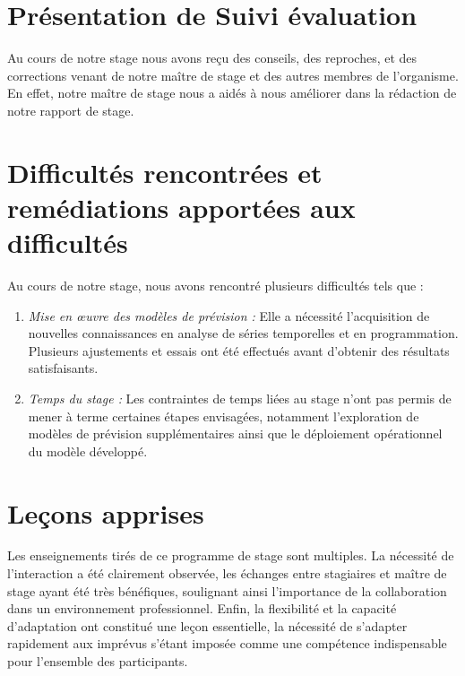 \documentclass[a4paper,12pt]{report}
\theoremstyle{definition}
\begin{document}
	\section{Présentation de Suivi évaluation}
	Au cours de notre stage nous avons reçu des conseils, des reproches, et des corrections venant de notre maître de stage et des autres membres de l'organisme. En effet, notre maître de stage nous a aidés à nous améliorer dans la rédaction de notre rapport de stage. %
	\section{Difficultés rencontrées et remédiations apportées aux difficultés}
	Au cours de notre stage, nous avons rencontré plusieurs difficultés tels que : 
	\begin{enumerate}
		\item \textit{Mise en œuvre des modèles de prévision :} Elle a nécessité l'acquisition de nouvelles connaissances en analyse de séries temporelles et en programmation. Plusieurs ajustements et essais ont été effectués avant d'obtenir des résultats satisfaisants.
		\item \textit{Temps du stage :} Les contraintes de temps liées au stage n'ont pas permis de mener à terme certaines étapes envisagées, notamment l'exploration de modèles de prévision supplémentaires ainsi que le déploiement opérationnel du modèle développé.
	\end{enumerate}
	\section{Leçons apprises}
	Les enseignements tirés de ce programme de stage sont multiples. %
	La nécessité de l’interaction a été clairement observée, les échanges entre stagiaires et maître de stage ayant été très bénéfiques, soulignant ainsi l’importance de la collaboration dans un environnement professionnel. Enfin, la flexibilité et la capacité d’adaptation ont constitué une leçon essentielle, la nécessité de s’adapter rapidement aux imprévus s’étant imposée comme une compétence indispensable pour l’ensemble des participants.
\end{document}
